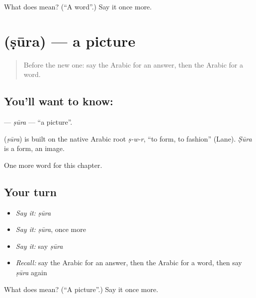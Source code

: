 \begin{tcolorbox}[breakable,colback=teal!4,colframe=teal!35!black,title={Before you move on}]
What does  mean? (\textquotedblleft{}A word\textquotedblright{}.) Say it once more.
\end{tcolorbox}
\section[\texorpdfstring{\ar{صورة} (ṣūra)}{صورة (ṣūra)}]{ (ṣūra) — a picture}

\label{lesson:AR-C75-sura}



\begin{quote}
Before the new one: say the Arabic for an answer, then the Arabic for a word.
\end{quote}

\subsection*{You'll want to know: }
\textbf{} — \emph{ṣūra} — \textquotedblleft{}a picture\textquotedblright{}.

\begin{cousinweb}
\textbf{} (\emph{ṣūra}) is built on the native Arabic root \emph{ṣ-w-r}, \textquotedblleft{}to form, to fashion\textquotedblright{} (Lane). \emph{Ṣūra} is a form, an image.
\end{cousinweb}

\begin{grammarlens}[title={What you've built}]
One more word for this chapter.
\end{grammarlens}

\subsection*{Your turn}
\begin{itemize}
\raggedright
  \item \emph{Say it:} \emph{ṣūra}
  \item \emph{Say it:} \emph{ṣūra}, once more
  \item \emph{Say it:} say \emph{ṣūra}
  \item \emph{Recall:} say the Arabic for an answer, then the Arabic for a word, then say \emph{ṣūra} again
\end{itemize}

\begin{tcolorbox}[breakable,colback=teal!4,colframe=teal!35!black,title={Before you move on}]
What does  mean? (\textquotedblleft{}A picture\textquotedblright{}.) Say it once more.
\end{tcolorbox}
